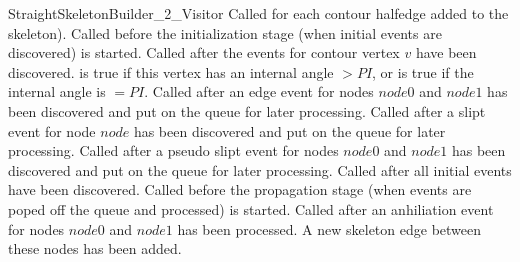 \begin{ccRefConcept}{StraightSkeletonBuilder_2_Visitor}
         {Called for each contour halfedge added to the skeleton).}
\ccGlue
{}
         {Called before the initialization stage (when initial events are discovered) is started.}
\ccGlue
{}
         {Called after the events for contour vertex $v$ have been discovered.  is true 
          if this vertex has an internal angle $>PI$, or  is true
          if the internal angle is $=PI$.}
\ccGlue
{}
         {Called after an edge event for nodes $node0$ and $node1$ has been discovered 
          and put on the queue for later processing.}
\ccGlue
{}
         {Called after a slipt event for node $node$ has been discovered 
          and put on the queue for later processing.}
\ccGlue
{}
         {Called after a pseudo slipt event for nodes $node0$ and $node1$ has been discovered 
          and put on the queue for later processing.}
\ccGlue
{}
         {Called after all initial events have been discovered.}
\ccGlue
{}
         {Called before the propagation stage (when events are poped off the queue and processed) 
          is started.}
\ccGlue
{}
         {Called after an anhiliation event for nodes $node0$ and $node1$ has been processed. 
          A new skeleton edge between these nodes has been added.}
\ccGlue
{}
\end{ccRefConcept}
